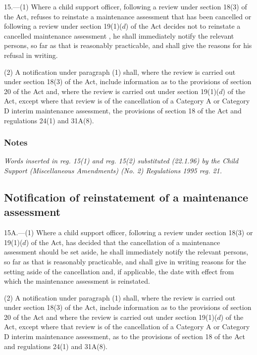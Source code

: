 \documentclass[a4paper]{article}
\newcommand\amendment[1]{\subsubsection*{Notes}{\itshape\frenchspacing\footnotesize #1 \par}}
\begin{document}
15.—(1) Where a child support officer, following a review under section 18(3) of the Act, refuses to reinstate a maintenance assessment that has been cancelled
or following a review under section 19(1)($d$) of the Act decides not to reinstate a cancelled maintenance assessment%
, he shall immediately notify the relevant persons, so far as that is reasonably practicable, and shall give the reasons for his refusal in writing.


(2) A notification under paragraph (1) shall, where the review is carried out under section 18(3) of the Act, include information as to the provisions of section 20 of the Act and, where the review is carried out under section 19(1)($d$) of the Act, except where that review is of the cancellation of a Category A or Category D interim maintenance assessment, the provisions of section 18 of the Act and regulations 24(1) and 31A(8).

\amendment{
Words inserted in reg. 15(1) and reg. 15(2) substituted (22.1.96) by the Child Support (Miscellaneous Amendments) (No. 2) Regulations 1995 reg. 21.
}

\subsection[15A. Notification of reinstatement of a maintenance assessment]{Notification of reinstatement of a maintenance assessment}

15A.—(1) Where a child support officer, following a review under section 18(3) or 19(1)($d$) of the Act, has decided that the cancellation of a maintenance assessment should be set aside, he shall immediately notify the relevant persons, so far as that is reasonably practicable, and shall give in writing reasons for the setting aside of the cancellation and, if applicable, the date with effect from which the maintenance assessment is reinstated.

(2) A notification under paragraph (1) shall, where the review is carried out under section 18(3) of the Act, include information as to the provisions of section 20 of the Act
and where the review is carried out under section 19(1)($d$) of the Act, except where that review is of the cancellation of a Category A or Category D interim maintenance assessment, as to the provisions of section 18 of the Act and regulations 24(1) and 31A(8).  %
\end{document}
